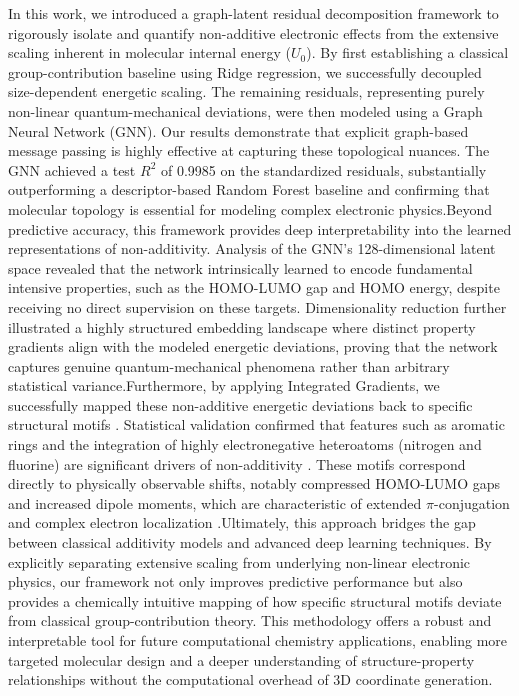 \documentclass[]{article}
\begin{document}
In this work, we introduced a graph-latent residual decomposition framework to rigorously isolate and quantify non-additive electronic effects from the extensive scaling inherent in molecular internal energy ($U_0$). By first establishing a classical group-contribution baseline using Ridge regression, we successfully decoupled size-dependent energetic scaling. The remaining residuals, representing purely non-linear quantum-mechanical deviations, were then modeled using a Graph Neural Network (GNN). Our results demonstrate that explicit graph-based message passing is highly effective at capturing these topological nuances. The GNN achieved a test $R^2$ of 0.9985 on the standardized residuals, substantially outperforming a descriptor-based Random Forest baseline and confirming that molecular topology is essential for modeling complex electronic physics.Beyond predictive accuracy, this framework provides deep interpretability into the learned representations of non-additivity. Analysis of the GNN's 128-dimensional latent space revealed that the network intrinsically learned to encode fundamental intensive properties, such as the HOMO-LUMO gap and HOMO energy, despite receiving no direct supervision on these targets. Dimensionality reduction further illustrated a highly structured embedding landscape where distinct property gradients align with the modeled energetic deviations, proving that the network captures genuine quantum-mechanical phenomena rather than arbitrary statistical variance.Furthermore, by applying Integrated Gradients, we successfully mapped these non-additive energetic deviations back to specific structural motifs \citep{sundararajan2017axiomaticattributiondeepnetworks,polat2025xchemagentsagenticaiexplainable,ji2026molledgeradditivegraphneural}. Statistical validation confirmed that features such as aromatic rings and the integration of highly electronegative heteroatoms (nitrogen and fluorine) are significant drivers of non-additivity \citep{lundstrom2022rigorousstudyintegratedgradients,wang2026explainablemolecularpropertyprediction}. These motifs correspond directly to physically observable shifts, notably compressed HOMO-LUMO gaps and increased dipole moments, which are characteristic of extended $\pi$-conjugation and complex electron localization \citep{chen2026interpretablemachinelearningquantuminformed,mick2026datafusioncontrastivealignment,bigting2026martinimapperautomatedfragmentbased}.Ultimately, this approach bridges the gap between classical additivity models and advanced deep learning techniques. By explicitly separating extensive scaling from underlying non-linear electronic physics, our framework not only improves predictive performance but also provides a chemically intuitive mapping of how specific structural motifs deviate from classical group-contribution theory. This methodology offers a robust and interpretable tool for future computational chemistry applications, enabling more targeted molecular design and a deeper understanding of structure-property relationships without the computational overhead of 3D coordinate generation.
\end{document}
